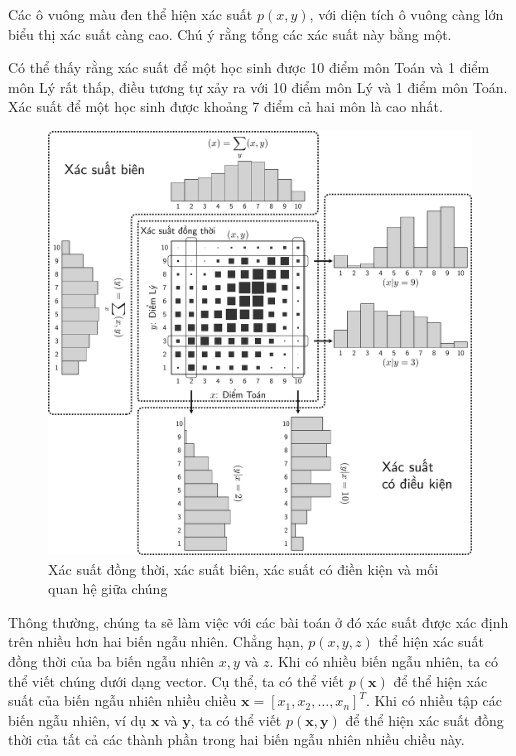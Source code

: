 Các ô vuông màu đen thể hiện xác suất $p(x, y)$, với diện tích ô vuông càng lớn
biểu thị xác suất càng cao. Chú ý rằng tổng các xác suất này bằng một.

{Có thể thấy rằng xác suất để một học sinh được 10 điểm môn Toán
và 1 điểm môn Lý rất thấp, điều tương tự xảy ra với 10 điểm môn Lý và 1 điểm môn
Toán. Xác suất để một học sinh được khoảng 7 điểm cả hai môn là cao
nhất.}



\begin{figure}[t]
\centering
    \includegraphics[width = \textwidth]{Chapters/02_LinearAlgebra/30_prob/latex/joint.pdf}
    \caption[]{Xác suất đồng thời, xác suất biên, xác suất có điền kiện và mối quan hệ giữa chúng}
    \label{fig:30_1}
\end{figure}

Thông thường, chúng ta sẽ làm việc với các bài toán ở đó xác suất được xác định
trên nhiều hơn hai biến ngẫu nhiên. Chẳng hạn, $p(x, y, z)$ thể hiện xác suất
đồng thời của ba biến ngẫu nhiên $x,y$ và $z$. Khi có nhiều biến ngẫu nhiên, ta
có thể viết chúng dưới dạng vector. Cụ thể, ta có thể viết $p(\mathbf{x})$ để
thể hiện xác suất của biến ngẫu nhiên nhiều chiều $\mathbf{x} =
[x_1, x_2, \dots, x_n]^T$. Khi có nhiều tập các biến ngẫu nhiên, ví dụ
$\mathbf{x}$ và $\mathbf{y}$, ta có thể viết $p(\mathbf{x},
\mathbf{y})$ để thể hiện xác suất đồng thời của tất cả các thành phần trong
hai biến ngẫu nhiên nhiều chiều này.

